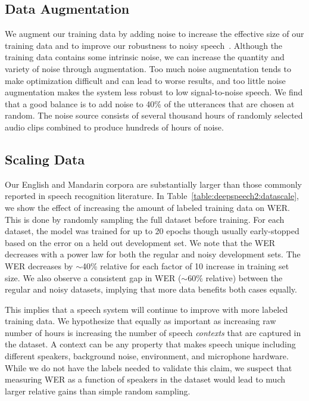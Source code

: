 \subsection{Data Augmentation}

We augment our training data by adding noise to increase the effective size of
our training data and to improve our robustness to noisy
speech~\cite{hannun2014deepspeech}. Although the training data contains some
intrinsic noise, we can increase the quantity and variety of noise through
augmentation. Too much noise augmentation tends to make optimization difficult
and can lead to worse results, and too little noise augmentation makes the
system less robust to low signal-to-noise speech.  We find that a good balance
is to add noise to 40\% of the utterances that are chosen at random. The noise
source consists of several thousand hours of randomly selected audio clips
combined to produce hundreds of hours of noise.

\subsection{Scaling Data}

Our English and Mandarin corpora are substantially larger than those commonly
reported in speech recognition literature. In
Table~\ref{table:deepspeech2:datascale}, we show the effect of increasing the
amount of labeled training data on WER. This is done by randomly sampling the
full dataset before training. For each dataset, the model was trained for up to
20 epochs though usually early-stopped based on the error on a held out
development set. We note that the WER decreases with a power law for both the
regular and noisy development sets. The WER decreases by $\sim$40\% relative
for each factor of 10 increase in training set size. We also observe a
consistent gap in WER ($\sim$60\% relative) between the regular and noisy
datasets, implying that more data benefits both cases equally. 

This implies that a speech system will continue to improve with more labeled
training data. We hypothesize that equally as important as increasing raw
number of hours is increasing the number of speech \emph{contexts} that are
captured in the dataset. A context can be any property that makes speech unique
including different speakers, background noise, environment, and microphone
hardware. While we do not have the labels needed to validate this claim, we
suspect that measuring WER as a function of speakers in the dataset would lead
to much larger relative gains than simple random sampling.

